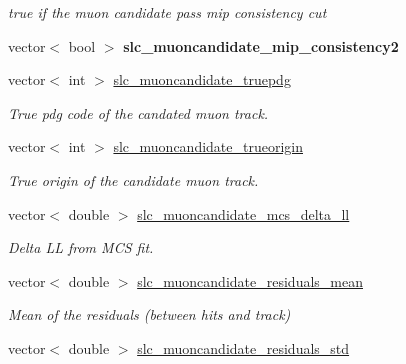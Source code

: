 \begin{DoxyCompactItemize}
\begin{DoxyCompactList}\small\item\em true if the muon candidate pass mip consistency cut \end{DoxyCompactList}\item 
\hypertarget{classUBXSecEvent_aeeaf9707b06c88065ce6a7ce56bcbbec}{vector$<$ bool $>$ {\bfseries slc\-\_\-muoncandidate\-\_\-mip\-\_\-consistency2}}\label{classUBXSecEvent_aeeaf9707b06c88065ce6a7ce56bcbbec}

\item 
\hypertarget{classUBXSecEvent_a861fa153e7ab975f01780edfaf8f280c}{vector$<$ int $>$ \hyperlink{classUBXSecEvent_a861fa153e7ab975f01780edfaf8f280c}{slc\-\_\-muoncandidate\-\_\-truepdg}}\label{classUBXSecEvent_a861fa153e7ab975f01780edfaf8f280c}

\begin{DoxyCompactList}\small\item\em True pdg code of the candated muon track. \end{DoxyCompactList}\item 
\hypertarget{classUBXSecEvent_a6013262692b0ae27bd36a28dde410c72}{vector$<$ int $>$ \hyperlink{classUBXSecEvent_a6013262692b0ae27bd36a28dde410c72}{slc\-\_\-muoncandidate\-\_\-trueorigin}}\label{classUBXSecEvent_a6013262692b0ae27bd36a28dde410c72}

\begin{DoxyCompactList}\small\item\em True origin of the candidate muon track. \end{DoxyCompactList}\item 
\hypertarget{classUBXSecEvent_a2debf701edaaaf07b40603c5196c9df0}{vector$<$ double $>$ \hyperlink{classUBXSecEvent_a2debf701edaaaf07b40603c5196c9df0}{slc\-\_\-muoncandidate\-\_\-mcs\-\_\-delta\-\_\-ll}}\label{classUBXSecEvent_a2debf701edaaaf07b40603c5196c9df0}

\begin{DoxyCompactList}\small\item\em Delta L\-L from M\-C\-S fit. \end{DoxyCompactList}\item 
\hypertarget{classUBXSecEvent_a11364cce51cab53e8b49e2238d8b3ad9}{vector$<$ double $>$ \hyperlink{classUBXSecEvent_a11364cce51cab53e8b49e2238d8b3ad9}{slc\-\_\-muoncandidate\-\_\-residuals\-\_\-mean}}\label{classUBXSecEvent_a11364cce51cab53e8b49e2238d8b3ad9}

\begin{DoxyCompactList}\small\item\em Mean of the residuals (between hits and track) \end{DoxyCompactList}\item 
\hypertarget{classUBXSecEvent_aa2788c59b677811df5ed22223a7b0fe8}{vector$<$ double $>$ \hyperlink{classUBXSecEvent_aa2788c59b677811df5ed22223a7b0fe8}{slc\-\_\-muoncandidate\-\_\-residuals\-\_\-std}}\label{classUBXSecEvent_aa2788c59b677811df5ed22223a7b0fe8}


\end{DoxyCompactItemize}
